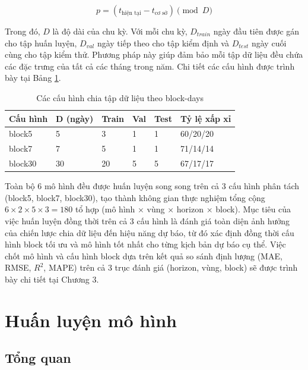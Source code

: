 \begin{equation}
    p = (t_{\text{hiện tại}} - t_{\text{cơ sở}}) \pmod D
\end{equation}

Trong đó, $D$ là độ dài của chu kỳ. Với mỗi chu kỳ, $D_{train}$ ngày đầu tiên được gán cho tập huấn luyện, $D_{val}$ ngày tiếp theo cho tập kiểm định và $D_{test}$ ngày cuối cùng cho tập kiểm thử. Phương pháp này giúp đảm bảo mỗi tập dữ liệu đều chứa các đặc trưng của tất cả các tháng trong năm. Chi tiết các cấu hình được trình bày tại Bảng \ref{tab:cau_hinh_block_days}.

\begin{table}[H]
    \centering
    \caption{Các cấu hình chia tập dữ liệu theo block-days}
    \label{tab:cau_hinh_block_days}
    \renewcommand{\arraystretch}{1.3}
    \begin{tabular}{p{2.5cm} p{2cm} p{2cm} p{2cm} p{2cm} p{2.5cm}}
    \toprule
    \textbf{Cấu hình} & \textbf{D (ngày)} & \textbf{Train} & \textbf{Val} & \textbf{Test} & \textbf{Tỷ lệ xấp xỉ} \\
    \midrule
    block5 & 5 & 3 & 1 & 1 & 60/20/20 \\
    block7 & 7 & 5 & 1 & 1 & 71/14/14 \\
    block30 & 30 & 20 & 5 & 5 & 67/17/17 \\
    \bottomrule
    \end{tabular}
\end{table}

Toàn bộ 6 mô hình đều được huấn luyện song song trên cả 3 cấu hình phân tách (block5, block7, block30), tạo thành không gian thực nghiệm tổng cộng $6 \times 2 \times 5 \times 3 = 180$ tổ hợp (mô hình $\times$ vùng $\times$ horizon $\times$ block). Mục tiêu của việc huấn luyện đồng thời trên cả 3 cấu hình là đánh giá toàn diện ảnh hưởng của chiến lược chia dữ liệu đến hiệu năng dự báo, từ đó xác định đồng thời cấu hình block tối ưu và mô hình tốt nhất cho từng kịch bản dự báo cụ thể. Việc chốt mô hình và cấu hình block dựa trên kết quả so sánh định lượng (MAE, RMSE, $R^2$, MAPE) trên cả 3 trục đánh giá (horizon, vùng, block) sẽ được trình bày chi tiết tại Chương 3.

\section{Huấn luyện mô hình}

\subsection{Tổng quan}


